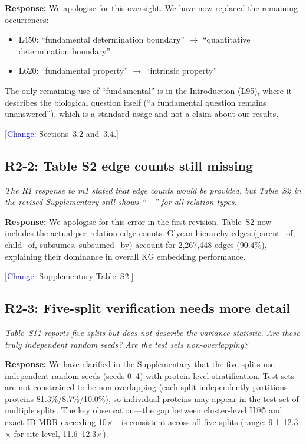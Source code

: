 \documentclass[11pt,a4paper]{article}
\newcommand{\reviewercomment}[1]{\textit{\color{black!70}#1}}
\newcommand{\response}[1]{\textbf{Response:} #1}
\newcommand{\change}[1]{[\textcolor{blue}{Change:} #1]}
\begin{document}
\response{We apologise for this oversight. We have now replaced the remaining
occurrences:
\begin{itemize}[nosep]
  \item L450: ``fundamental determination boundary'' $\to$ ``quantitative
        determination boundary''
  \item L620: ``fundamental property'' $\to$ ``intrinsic property''
\end{itemize}
The only remaining use of ``fundamental'' is in the Introduction (L95),
where it describes the biological question itself (``a fundamental question
remains unanswered''), which is a standard usage and not a claim about our
results.}

\change{Sections~3.2 and~3.4.}

\subsection*{R2-2: Table S2 edge counts still missing}

\reviewercomment{The R1 response to m1 stated that edge counts would be
provided, but Table~S2 in the revised Supplementary still shows ``---'' for
all relation types.}

\response{We apologise for this error in the first revision. Table~S2 now
includes the actual per-relation edge counts. Glycan hierarchy edges
(parent\_of, child\_of, subsumes, subsumed\_by) account for 2,267,448 edges
(90.4\%), explaining their dominance in overall KG embedding performance.}

\change{Supplementary Table~S2.}

\subsection*{R2-3: Five-split verification needs more detail}

\reviewercomment{Table~S11 reports five splits but does not describe the
variance statistic. Are these truly independent random seeds? Are the test
sets non-overlapping?}

\response{We have clarified in the Supplementary that the five splits use
independent random seeds (seeds 0--4) with protein-level stratification. Test
sets are not constrained to be non-overlapping (each split independently
partitions proteins 81.3\%/8.7\%/10.0\%), so individual proteins may appear in
the test set of multiple splits. The key observation---the gap between
cluster-level H@5 and exact-ID MRR exceeding 10$\times$---is consistent
across all five splits (range: 9.1--12.3$\times$ for site-level, 11.6--12.3$\times$).}
\end{document}
